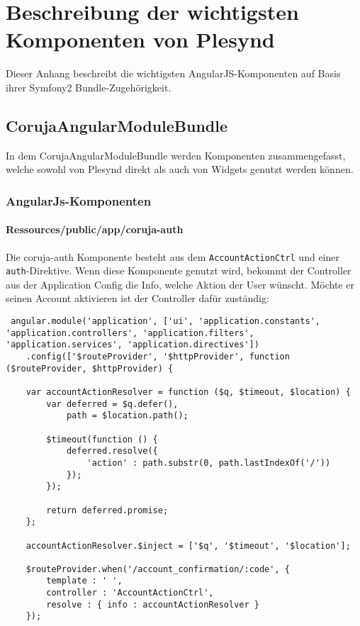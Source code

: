 \chapter{Beschreibung der wichtigsten Komponenten von Plesynd}
\label{AppendixC}

Dieser Anhang beschreibt die wichtigsten AngularJS-Komponenten auf Basis ihrer Symfony2 Bundle-Zugehörigkeit.
\section{CorujaAngularModuleBundle}
In dem CorujaAngularModuleBundle werden Komponenten zusammengefasst, welche sowohl von Plesynd direkt als auch von Widgets genutzt werden können. 

\subsection{AngularJs-Komponenten}

\subsubsection*{Ressources/public/app/coruja-auth}\label{section:coruja_auth}
Die coruja-auth Komponente besteht aus dem \texttt{AccountActionCtrl} und einer \texttt{auth}-Direktive. Wenn diese Komponente genutzt wird, bekommt der Controller aus der Application Config die Info, welche Aktion der User wünscht. Möchte er seinen Account aktivieren ist der Controller dafür zuständig:
\begin{lstlisting}
 angular.module('application', ['ui', 'application.constants', 'application.controllers', 'application.filters', 'application.services', 'application.directives'])
    .config(['$routeProvider', '$httpProvider', function ($routeProvider, $httpProvider) {

    var accountActionResolver = function ($q, $timeout, $location) {
        var deferred = $q.defer(),
            path = $location.path();

        $timeout(function () {
            deferred.resolve({
                'action' : path.substr(0, path.lastIndexOf('/'))
            });
        });

        return deferred.promise;
    };

    accountActionResolver.$inject = ['$q', '$timeout', '$location'];

    $routeProvider.when('/account_confirmation/:code', {
        template : ' ',
        controller : 'AccountActionCtrl',
        resolve : { info : accountActionResolver }
    });

\end{lstlisting}

